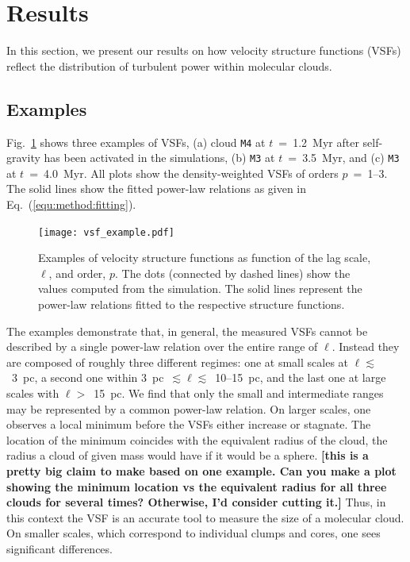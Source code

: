 \section{Results}\label{results}

In this section, we present our results on how velocity structure functions (VSFs) reflect the distribution of turbulent power within molecular clouds.

\subsection{Examples}
Fig.~\ref{pic:results:vsf_example} shows three examples of VSFs, (a) cloud \texttt{M4} at $t$~=~1.2~Myr after self-gravity has been activated in the simulations, (b) \texttt{M3} at $t$~=~3.5~Myr, and (c) \texttt{M3} at $t$~=~4.0~Myr.
All plots show the
    density-weighted 
VSFs of orders $p$~=~1--3.
The solid lines show the fitted power-law relations as given in Eq.~(\ref{equ:method:fitting}).

\begin{figure}[!htb]
	\centering
	\texttt{[image: vsf\_example.pdf]}
    \caption{Examples of velocity structure functions as function of the lag scale, $\ell$, and order, $p$. 
    	The dots (connected by dashed lines) 
    show the values computed from the simulation.
        The solid lines represent the power-law relations fitted to the respective structure functions.
	}
    \label{pic:results:vsf_example}
\end{figure}

The examples demonstrate that, in general, the measured VSFs cannot be described by a single power-law relation over the entire range of $\ell$.
Instead they are composed of roughly three different regimes: 
one at small scales at $\ell \lesssim$~3~pc, a second one within 3~pc~$\lesssim \ell \lesssim$~10--15~pc, and the last one at large scales with $\ell >$~15~pc.
    We find that
only the small and intermediate ranges may be represented by a common power-law relation.
On larger scales, one observes a local minimum before the VSFs either increase or stagnate.
The location of the minimum coincides with the equivalent radius of the cloud, the radius a cloud of given mass would have if it would be a sphere.
{\bf [this is a pretty big claim to make based on one example. Can you make a plot showing the minimum location vs the equivalent radius for all three clouds for several times?  Otherwise, I'd consider cutting it.]}
Thus, in this context the VSF is an accurate tool to measure the size of a molecular cloud.
On smaller scales, which correspond to individual clumps and cores, one sees significant differences.

